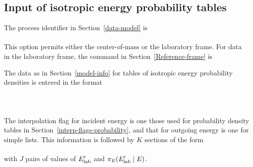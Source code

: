\subsection{Input of isotropic energy probability tables}
\label{Sec:isotropic-table-lab}
The process identifier in Section~\ref{data-model} is\\
  \\
This option permits either the center-of-mass or the laboratory frame.
For data in the laboratory frame, the command in
Section~\ref{Reference-frame} is\\

The data as in Section~\ref{model-info}
for tables of isotropic energy probability densities is entered
in the format\\
  \\
  \\
  \\
The interpolation flag for incident energy is one those used for
probability density tables in Section~\ref{interp-flags-probability},
and that for outgoing energy is one for simple lists.
This information is followed
by $K$ sections of the form\\
  \\
with $J$ pairs of values of $E_{\text{lab}}'$ and $\pi_E(E_{\text{lab}}'   \mid E)$.

